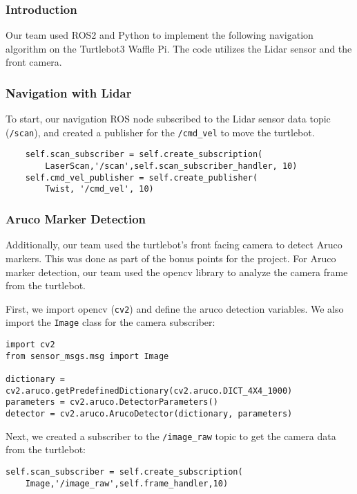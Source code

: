 \documentclass{article}
\begin{document}
\subsubsection{Introduction}

Our team used ROS2 and Python to implement the following navigation algorithm on the Turtlebot3 Waffle Pi. The code utilizes the Lidar sensor and the front camera.

\subsubsection{Navigation with Lidar}

To start, our navigation ROS node subscribed to the Lidar sensor data topic (\verb|/scan|), and created a publisher for the \verb|/cmd_vel| to move the turtlebot.

\begin{lstlisting}
    self.scan_subscriber = self.create_subscription(
        LaserScan,'/scan',self.scan_subscriber_handler, 10)
    self.cmd_vel_publisher = self.create_publisher(
        Twist, '/cmd_vel', 10)
\end{lstlisting}

\subsubsection{Aruco Marker Detection}

Additionally, our team used the turtlebot's front facing camera to detect Aruco markers. This was done as part of the bonus points for the project. For Aruco marker detection, our team used the opencv library to analyze the camera frame from the turtlebot. \par

First, we import opencv (\verb|cv2|) and define the aruco detection variables. We also import the \verb|Image| class for the camera subscriber:

\begin{lstlisting}
import cv2
from sensor_msgs.msg import Image

dictionary = cv2.aruco.getPredefinedDictionary(cv2.aruco.DICT_4X4_1000)
parameters = cv2.aruco.DetectorParameters()
detector = cv2.aruco.ArucoDetector(dictionary, parameters)
\end{lstlisting}

Next, we created a subscriber to the \verb|/image_raw| topic to get the camera data from the turtlebot:

\begin{lstlisting}
self.scan_subscriber = self.create_subscription(
    Image,'/image_raw',self.frame_handler,10)
\end{lstlisting}
\end{document}
